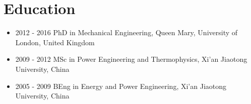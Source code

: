 \documentclass[letterpaper]{article}
\begin{document}
\section*{Education}
\begin{itemize}
  \item 2012 - 2016 \hspace{2pt} PhD in Mechanical Engineering, Queen Mary, University of London, United Kingdom
  \item 2009 - 2012 \hspace{2pt} MSc in Power Engineering and Thermophysics, Xi’an Jiaotong University, China
  \item 2005 - 2009 \hspace{2pt} BEng in Energy and Power Engineering, Xi’an Jiaotong University, China
\end{itemize}
\end{document}
